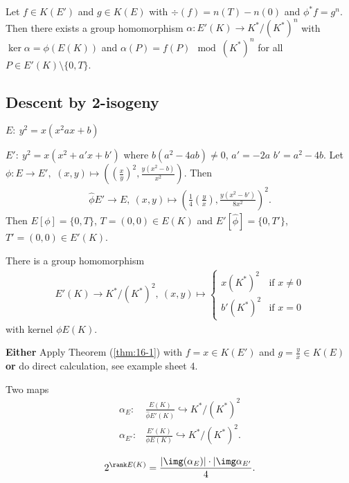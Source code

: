 \begin{thm}\label{thm:16-1}
	Let $f \in K(E')$ and $g \in K(E)$ with $\div(f) = n(T) - n(0)$ and $\phi^*f = g^n$. Then there exists a group homomorphism $\alpha: E'(K) \to K^*/(K^*)^n$ with $\ker \alpha = \phi(E(K))$ and $\alpha(P) = f(P) \mod (K^*)^n$ for all $P \in E'(K)\setminus \{0,T\}$.
\end{thm}

\subsection{Descent by 2-isogeny}
$E:~ y^2 = x(x^2 ax + b)$

$E':~ y^2 = x(x^2+a'x + b')$ where $b(a^2 - 4ab) \neq 0$, $a' = -2a$ $b' = a^2 - 4b$. Let $\phi:E\to E',$ $(x,y) \mapsto \left(\left(\frac{x}{y}\right)^2, \frac{y(x^2 - b)}{x^2}\right)$. Then
\begin{align*}
	\hat{\phi} E'\to E, ~ (x,y) \mapsto \left(\frac{1}{4}\left(\frac{y}{x}\right), \frac{y(x^2 - b')}{8x^2}\right)^2.
\end{align*}
Then $E[\phi] = \{0,T\}$, $T = (0,0) \in E(K)$ and $E'[\hat{\phi}] = \{0,T'\}$, $T' = (0,0) \in E'(K)$.
\begin{prop}
	There is a group homomorphism
	\begin{align*}
		E'(K) \to K^*/(K^*)^2, ~ (x,y) \mapsto
		\begin{cases}
			x(K^*)^2 & \text{if } x \neq 0 \\
			b'(K^*)^2 & \text{if } x = 0
		\end{cases}
	\end{align*}
	with kernel $\phi E(K)$.
\end{prop}
\begin{prf}
	\textbf{Either} Apply Theorem (\ref{thm:16-1}) with $f = x \in K(E')$ and $g = \frac{y}{x} \in K(E)$ \textbf{or} do direct calculation, see example sheet 4. 
\end{prf}
Two maps
	\begin{align*}
		\alpha_E:& \frac{E(K)}{\hat{\phi}E'(K)} \hookrightarrow K^*/(K^*)^2 \\
		\alpha_{E'}:& \frac{E'(K)}{\phi E(K)} \hookrightarrow K^*/(K^*)^2.
	\end{align*}
\begin{lem}\label{lem:16-3}
	\begin{align*}
		2^{\rank E(K)} = \frac{|\img(\alpha_E)| \cdot |\img \alpha_{E'}}{4}.
\end{align*}
\end{lem}
